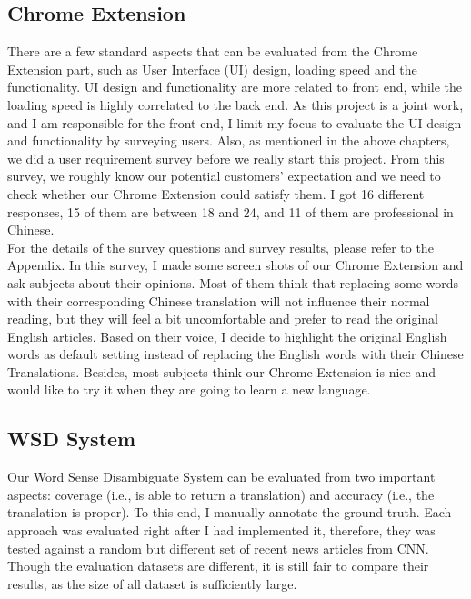 \documentclass[11pt]{article}
\begin{document}
\subsection{Chrome Extension}
There are a few standard aspects that can be evaluated from the Chrome Extension part, such as User Interface (UI) design, loading speed and the functionality. UI design and functionality are more related to front end, while the loading speed is highly correlated to the back end. As this project is a joint work, and I am responsible  for the front end, I limit my focus to evaluate the UI design and functionality by surveying users.
Also, as mentioned in the above chapters, we did a user requirement survey before we really start this project. From this survey, we roughly know  our potential customers' expectation and we need to check whether our Chrome Extension could satisfy them. I got 16 different responses, 15 of them are between 18 and 24, and 11 of them are professional in Chinese.
\\
For the details of the survey questions and survey results, please refer to the Appendix. In this survey, I made some screen shots of our Chrome Extension and ask subjects about their opinions. 
Most of them think that replacing some words with their corresponding Chinese translation will not influence their normal reading, but they will feel a bit uncomfortable and prefer to read the original English articles. Based on their voice, I decide to highlight the original English words as default setting instead of replacing the English words with their Chinese Translations. Besides, most subjects think our Chrome Extension is nice and would like to try it when they are going to learn a new language.
\\
\subsection{WSD System}
Our Word Sense Disambiguate System can be evaluated from two important aspects: coverage (i.e., is able to return a translation) and accuracy (i.e., the translation is proper). To this end, I manually annotate the ground truth. Each approach was evaluated  right after I had implemented it, therefore,  they was tested against a random but different set of recent news articles from CNN.  Though the evaluation datasets are different, it is still fair to compare their results, as the size of all dataset is sufficiently large. 
\end{document}
